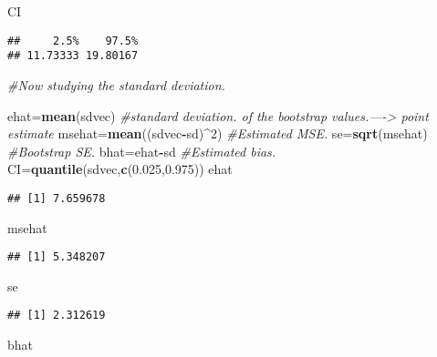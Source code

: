 \documentclass[]{article}
\newenvironment{Shaded}{\begin{snugshade}}{\end{snugshade}}
\newcommand{\CommentTok}[1]{\textcolor[rgb]{0.56,0.35,0.01}{\textit{#1}}}
\newcommand{\DecValTok}[1]{\textcolor[rgb]{0.00,0.00,0.81}{#1}}
\newcommand{\FloatTok}[1]{\textcolor[rgb]{0.00,0.00,0.81}{#1}}
\newcommand{\KeywordTok}[1]{\textcolor[rgb]{0.13,0.29,0.53}{\textbf{#1}}}
\newcommand{\NormalTok}[1]{#1}
\newcommand{\OperatorTok}[1]{\textcolor[rgb]{0.81,0.36,0.00}{\textbf{#1}}}
\begin{document}
\begin{Shaded}
\begin{Highlighting}[]
\NormalTok{CI}
\end{Highlighting}
\end{Shaded}

\begin{verbatim}
##     2.5%    97.5% 
## 11.73333 19.80167
\end{verbatim}

\begin{Shaded}
\begin{Highlighting}[]
\CommentTok{#Now studying the standard deviation.}

\NormalTok{ehat=}\KeywordTok{mean}\NormalTok{(sdvec) }\CommentTok{#standard deviation. of the bootstrap values.----> point estimate}
\NormalTok{msehat=}\KeywordTok{mean}\NormalTok{((sdvec}\OperatorTok{-}\NormalTok{sd)}\OperatorTok{^}\DecValTok{2}\NormalTok{) }\CommentTok{#Estimated MSE.}
\NormalTok{se=}\KeywordTok{sqrt}\NormalTok{(msehat) }\CommentTok{#Bootstrap SE.}
\NormalTok{bhat=ehat}\OperatorTok{-}\NormalTok{sd }\CommentTok{#Estimated bias.}
\NormalTok{CI=}\KeywordTok{quantile}\NormalTok{(sdvec,}\KeywordTok{c}\NormalTok{(}\FloatTok{0.025}\NormalTok{,}\FloatTok{0.975}\NormalTok{))}
\NormalTok{ehat}
\end{Highlighting}
\end{Shaded}

\begin{verbatim}
## [1] 7.659678
\end{verbatim}

\begin{Shaded}
\begin{Highlighting}[]
\NormalTok{msehat}
\end{Highlighting}
\end{Shaded}

\begin{verbatim}
## [1] 5.348207
\end{verbatim}

\begin{Shaded}
\begin{Highlighting}[]
\NormalTok{se}
\end{Highlighting}
\end{Shaded}

\begin{verbatim}
## [1] 2.312619
\end{verbatim}

\begin{Shaded}
\begin{Highlighting}[]
\NormalTok{bhat}
\end{Highlighting}
\end{Shaded}
\end{document}
